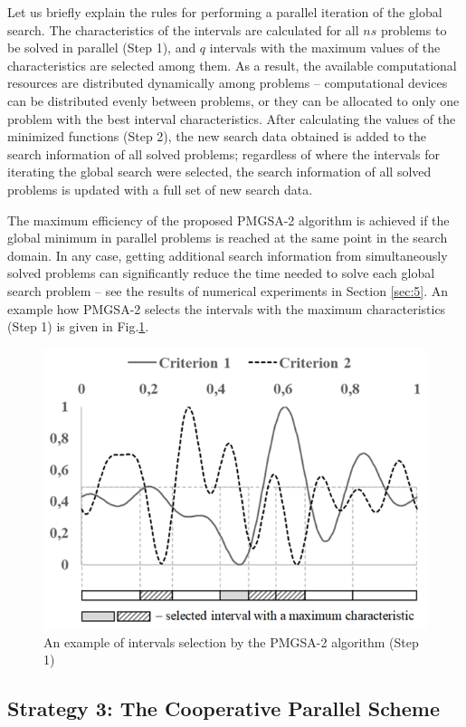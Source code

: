 \documentclass[review]{elsarticle}
\begin{document}
Let us briefly explain the rules for performing a parallel iteration of the global search. The characteristics of the intervals are calculated for all $ns$ problems to be solved in parallel (Step 1), and $q$ intervals with the maximum values of the characteristics are selected among them. As a result, the available computational resources are distributed dynamically among problems -- computational devices can be distributed evenly between problems, or they can be allocated to only one problem with the best interval characteristics. After calculating the values of the minimized functions (Step 2), the new search data obtained is added to the search information of all solved problems; regardless of where the intervals for iterating the global search were selected, the search information of all solved problems is updated with a full set of new search data.

The maximum efficiency of the proposed PMGSA-2 algorithm is achieved if the global minimum in parallel problems is reached at the same point in the search domain. In any case, getting additional search information from simultaneously solved problems can significantly reduce the time needed to solve each global search problem -- see the results of numerical experiments in Section \ref{sec:5}. An example how PMGSA-2 selects the intervals with the maximum characteristics (Step 1) is given in Fig.\ref{fig:3}.

\begin{figure}
  \centering
  \includegraphics[width=0.7\linewidth]{fig3}
  \caption{An example of intervals selection by the PMGSA-2 algorithm (Step 1)}
  \label{fig:3}
\end{figure}

\subsection{Strategy 3: The Cooperative Parallel Scheme} \label{subsec:3}
\end{document}
